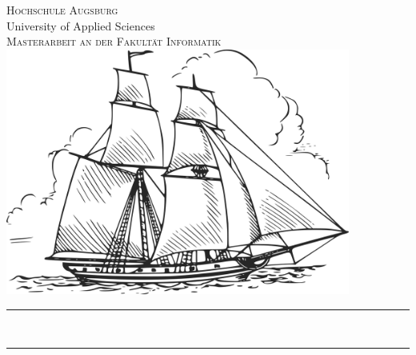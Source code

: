 \begin{titlepage}
\pagecolor{ThesisBackColor}
\begin{center}

\color{ThesisFontColor}
\textsc{\huge Hochschule Augsburg}\\[0.2cm]
\large University of Applied Sciences\\[1cm]
\textsc{\LARGE Masterarbeit an der Fakultät Informatik}\\[0.5cm]
\vspace{1em}
\includegraphics[width=0.85\textwidth]{images/title.png}~\\[1cm]

\rule{\linewidth}{0.5mm}

{\vspace{0.1cm}\Huge\bfseries \ThesisTitle\\[0.3cm]}
\rule{\linewidth}{0.5mm}

\vspace{0.5cm}


\end{center}
\end{titlepage}
